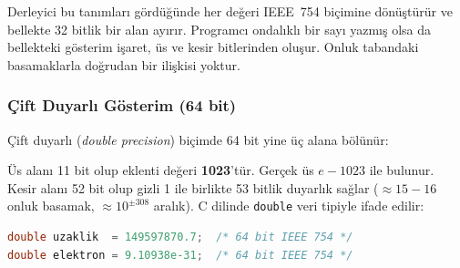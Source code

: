 Derleyici bu tanımları gördüğünde her değeri IEEE~754 biçimine dönüştürür ve bellekte 32 bitlik bir alan ayırır. Programcı ondalıklı bir sayı yazmış olsa da bellekteki gösterim işaret, üs ve kesir bitlerinden oluşur. Onluk tabandaki basamaklarla doğrudan bir ilişkisi yoktur.

\subsubsection{Çift Duyarlı Gösterim (64 bit)}

Çift duyarlı (\emph{double precision}) biçimde 64 bit yine üç alana bölünür:

\begin{center}
\end{center}

Üs alanı 11 bit olup eklenti değeri \textbf{1023}'tür. Gerçek üs $e - 1023$ ile bulunur. Kesir alanı 52 bit olup gizli 1 ile birlikte 53 bitlik duyarlık sağlar ($\approx 15{-}16$ onluk basamak, $\approx 10^{\pm 308}$ aralık). C dilinde \texttt{double} veri tipiyle ifade edilir:

\begin{lstlisting}[language=C, xleftmargin=2em]
double uzaklik  = 149597870.7;  /* 64 bit IEEE 754 */
double elektron = 9.10938e-31;  /* 64 bit IEEE 754 */
\end{lstlisting}

